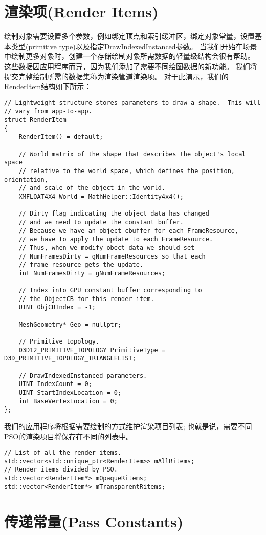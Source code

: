 \section{渲染项(Render Items)}
\begin{flushleft}
绘制对象需要设置多个参数，例如绑定顶点和索引缓冲区，绑定对象常量，设置基本类型(primitive type)以及指定DrawIndexedInstanced参数。 当我们开始在场景中绘制更多对象时，创建一个存储绘制对象所需数据的轻量级结构会很有帮助。 这些数据因应用程序而异，因为我们添加了需要不同绘图数据的新功能。 我们将提交完整绘制所需的数据集称为渲染管道渲染项。 对于此演示，我们的RenderItem结构如下所示：\\
\end{flushleft}
\begin{lstlisting}
// Lightweight structure stores parameters to draw a shape.  This will
// vary from app-to-app.
struct RenderItem
{
    RenderItem() = default;

    // World matrix of the shape that describes the object's local space
    // relative to the world space, which defines the position, orientation,
    // and scale of the object in the world.
    XMFLOAT4X4 World = MathHelper::Identity4x4();

    // Dirty flag indicating the object data has changed 
    // and we need to update the constant buffer.
    // Because we have an object cbuffer for each FrameResource, 
    // we have to apply the update to each FrameResource.  
    // Thus, when we modify obect data we should set 
    // NumFramesDirty = gNumFrameResources so that each 
    // frame resource gets the update.
    int NumFramesDirty = gNumFrameResources;

    // Index into GPU constant buffer corresponding to 
    // the ObjectCB for this render item.
    UINT ObjCBIndex = -1;

    MeshGeometry* Geo = nullptr;

    // Primitive topology.
    D3D12_PRIMITIVE_TOPOLOGY PrimitiveType = D3D_PRIMITIVE_TOPOLOGY_TRIANGLELIST;

    // DrawIndexedInstanced parameters.
    UINT IndexCount = 0;
    UINT StartIndexLocation = 0;
    int BaseVertexLocation = 0;
};
\end{lstlisting}
\begin{flushleft}
我们的应用程序将根据需要绘制的方式维护渲染项目列表; 也就是说，需要不同PSO的渲染项目将保存在不同的列表中。\\
\end{flushleft}
\begin{lstlisting}
// List of all the render items.
std::vector<std::unique_ptr<RenderItem>> mAllRitems;
// Render items divided by PSO.
std::vector<RenderItem*> mOpaqueRitems;
std::vector<RenderItem*> mTransparentRitems;
\end{lstlisting}

\section{传递常量(Pass Constants)}



